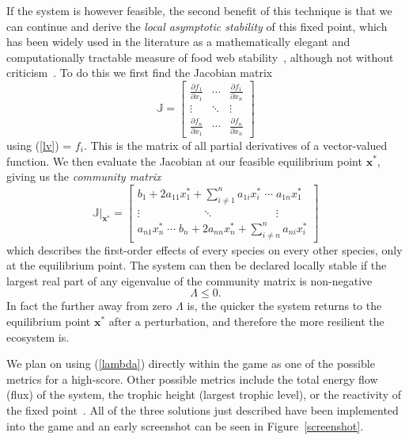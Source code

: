 If the system is however feasible, the second benefit of this technique is that we can continue and derive the \emph{local asymptotic stability} of this fixed point, which has been widely used in the literature as a mathematically elegant and computationally tractable measure of food web stability~\cite{may, emmerson}, although not without criticism~\cite{reactivity, axelrossberg}. To do this we first find the Jacobian matrix
\begin{equation}
  \mathbb{J} = \begin{bmatrix}
  \frac{\partial f_1}{\partial x_1} & 
  \cdots &
  \frac{\partial f_1}{\partial x_n} \\
  \vdots &
  \ddots &
  \vdots \\
  \frac{\partial f_n}{\partial x_1} & 
  \cdots &
  \frac{\partial f_n}{\partial x_n}
  \end{bmatrix}
\end{equation}
using (\ref{lv}) = $f_i$.
This is the matrix of all partial derivatives of a vector-valued function. We then evaluate the Jacobian at our feasible equilibrium point $\mathbf{x}^*$, giving us the \emph{community matrix}
\begin{equation}
    \mathbb{J}|_\mathbf{x^*} = \begin{bmatrix}
    b_1 + 2a_{11}x_1^* + \sum_{i\neq 1}^na_{1i}x_i^*
    \;\cdots\;
    a_{1n}x_1^*\\
    \vdots 
    \qquad\qquad\quad\;\;\ddots\qquad\qquad\quad\;\;
    \vdots \\
    a_{n1}x_n^*
    \;\cdots\;
    b_n + 2a_{nn}x_n^* + \sum_{i\neq n}^na_{ni}x_i^* 
    \end{bmatrix}
\end{equation}
which describes the first-order effects of every species on every other species, only at the equilibrium point.
The system can then be declared locally stable if the largest real part of any eigenvalue of the community matrix is non-negative
\begin{equation}
    \Lambda \leq 0.
    \label{lambda}
\end{equation}
In fact the further away from zero $\Lambda$ is, the quicker the system returns to the equilibrium point $\mathbf{x}^*$ after a perturbation, and therefore the more resilient the ecosystem is.

We plan on using (\ref{lambda}) directly within the game as one of the possible metrics for a high-score.
Other possible metrics include the total energy flow (flux) of the system, the trophic height (largest trophic level), or the reactivity of the fixed point~\cite{reactivity}.
All of the three solutions just described have been implemented into the game and an early screenshot can be seen in Figure~\ref{screenshot}.

